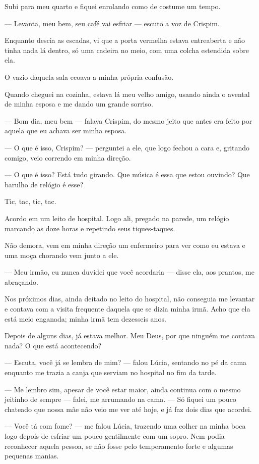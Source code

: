 Subi para meu quarto e fiquei enrolando como de costume um tempo.

— Levanta, meu bem, seu café vai esfriar — escuto a voz de Crispim.

Enquanto descia as escadas, vi que a porta vermelha estava entreaberta e não tinha nada lá dentro, só uma cadeira no meio, com uma colcha estendida sobre ela.

O vazio daquela sala ecoava a minha própria confusão.

Quando cheguei na cozinha, estava lá meu velho amigo, usando ainda o avental de minha esposa e me dando um grande sorriso.

— Bom dia, meu bem — falava Crispim, do mesmo jeito que antes era feito por aquela que eu achava ser minha esposa.

— O que é isso, Crispim? — perguntei a ele, que logo fechou a cara e, gritando comigo, veio correndo em minha direção.

— O que é isso? Está tudo girando. Que música é essa que estou ouvindo? Que barulho de relógio é esse?

Tic, tac, tic, tac.

Acordo em um leito de hospital. Logo ali, pregado na parede, um relógio marcando as doze horas e repetindo seus tiques-taques.

Não demora, vem em minha direção um enfermeiro para ver como eu estava e uma moça chorando vem junto a ele.

— Meu irmão, eu nunca duvidei que você acordaria — disse ela, aos prantos, me abraçando.

Nos próximos dias, ainda deitado no leito do hospital, não conseguia me levantar e contava com a visita frequente daquela que se dizia minha irmã. Acho que ela está meio enganada; minha irmã tem dezesseis anos.

Depois de alguns dias, já estava melhor. Meu Deus, por que ninguém me contava nada? O que está acontecendo?

— Escuta, você já se lembra de mim? — falou Lúcia, sentando no pé da cama enquanto me trazia a canja que serviam no hospital no fim da tarde.

— Me lembro sim, apesar de você estar maior, ainda continua com o mesmo jeitinho de sempre — falei, me arrumando na cama. — Só fiquei um pouco chateado que nossa mãe não veio me ver até hoje, e já faz dois dias que acordei.

— Você tá com fome? — me falou Lúcia, trazendo uma colher na minha boca logo depois de esfriar um pouco gentilmente com um sopro. Nem podia reconhecer aquela pessoa, se não fosse pelo temperamento forte e algumas pequenas manias.


